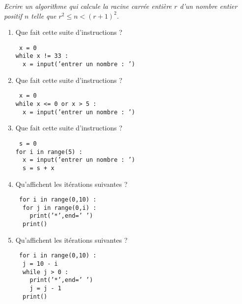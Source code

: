 \begin{td}\label{td:racine}\em {}
Ecrire un algorithme qui calcule la racine carrée entière $r$ 
d'un nombre entier positif $n$ telle que $r^2 \leq n < (r+1)^2$.
\end{td}

\begin{td}\label{td:iterations}\em {}
\begin{minipage}[t]{8cm}
\begin{enumerate}
\item Que fait cette suite d'instructions ?

	{\footnotesize\tt
	x = 0\\
	while x != 33 :\\
	\mbox{}\ \ x = input('entrer un nombre : ')
	}
\item Que fait cette suite d'instructions ?

	{\footnotesize\tt
	x = 0\\
	while x <= 0 or x > 5 :\\
	\mbox{}\ \ x = input('entrer un nombre : ')
	}
\item Que fait cette suite d'instructions ?

	{\footnotesize\tt
	s = 0\\
	for i in range(5) :\\
	\mbox{}\ \ x = input('entrer un nombre : ')\\
	\mbox{}\ \ s = s + x
	}
\end{enumerate}
\end{minipage}
\hfill
\begin{minipage}[t]{8cm}
\begin{enumerate}\setcounter{enumi}{3}
\item Qu'affichent les itérations suivantes ?

	{\footnotesize\tt
	for i in range(0,10) :\\
	\mbox{}\ \ for j in range(0,i) :\\
	\mbox{}\ \ \ \ print('*',end=' ')\\
	\mbox{}\ \ print()
	}
\item Qu'affichent les itérations suivantes ?

	{\footnotesize\tt
	for i in range(0,10) :\\
	\mbox{}\ \ j = 10 - i\\
	\mbox{}\ \ while j > 0 :\\
	\mbox{}\ \ \ \ print('*',end=' ')\\
	\mbox{}\ \ \ \ j = j - 1\\
	\mbox{}\ \ print()
	}
\end{enumerate}
\end{minipage}


\end{td}
